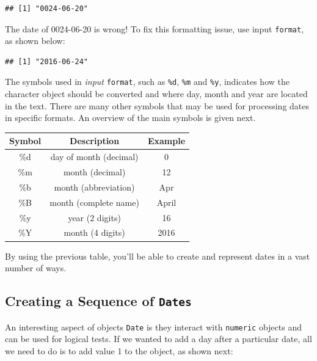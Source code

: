 \documentclass[11pt,]{book}
\newenvironment{Shaded}{\begin{snugshade}}{\end{snugshade}}
\newcommand{\KeywordTok}[1]{\textcolor[rgb]{0.27,0.27,0.27}{\textbf{#1}}}
\newcommand{\DataTypeTok}[1]{\textcolor[rgb]{0.27,0.27,0.27}{#1}}
\newcommand{\StringTok}[1]{\textcolor[rgb]{0.5,0.5,0.5}{#1}}
\newcommand{\CommentTok}[1]{\textcolor[rgb]{0.56,0.35,0.01}{\textit{#1}}}
\newcommand{\NormalTok}[1]{#1}
\begin{document}
\begin{verbatim}
## [1] "0024-06-20"
\end{verbatim}

The date of 0024-06-20 is wrong! To fix this formatting issue, use input
\texttt{format}, as shown below:

\begin{Shaded}
\end{Shaded}

\begin{verbatim}
## [1] "2016-06-24"
\end{verbatim}

The symbols used in \emph{input} \texttt{format}, such as \texttt{\%d},
\texttt{\%m} and \texttt{\%y}, indicates how the character object should
be converted and where day, month and year are located in the text.
There are many other symbols that may be used for processing dates in
specific formats. An overview of the main symbols is given next.

\begin{longtable}[]{@{}ccc@{}}
\toprule
Symbol & Description & Example\tabularnewline
\midrule
\endhead
\%d & day of month (decimal) & 0\tabularnewline
\%m & month (decimal) & 12\tabularnewline
\%b & month (abbreviation) & Apr\tabularnewline
\%B & month (complete name) & April\tabularnewline
\%y & year (2 digits) & 16\tabularnewline
\%Y & month (4 digits) & 2016\tabularnewline
\bottomrule
\end{longtable}

By using the previous table, you'll be able to create and represent
dates in a vast number of ways.

\subsection{\texorpdfstring{Creating a Sequence of
\texttt{Dates}}{Creating a Sequence of Dates}}\label{creating-a-sequence-of-dates}

An interesting aspect of objects \texttt{Date} is they interact with
\texttt{numeric} objects and can be used for logical tests. If we wanted
to add a day after a particular date, all we need to do is to add value
1 to the object, as shown next: 
\end{document}
